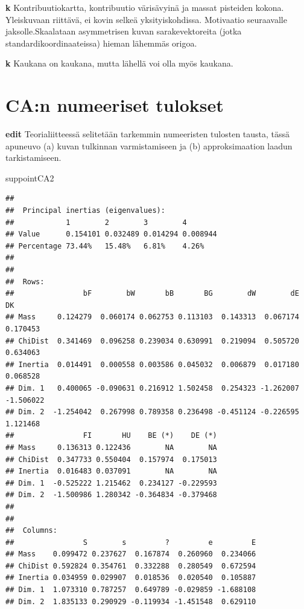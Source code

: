 \documentclass[
  finnish,
]{book}
\newenvironment{Shaded}{\begin{snugshade}}{\end{snugshade}}
\newcommand{\NormalTok}[1]{#1}
\begin{document}
\textbf{k} Kontribuutiokartta, kontribuutio värisävyinä ja massat
pisteiden kokona. Yleiskuvaan riittävä, ei kovin selkeä
yksityiskohdissa. Motivaatio seuraavalle jaksolle.Skaalataan
asymmetrisen kuvan sarakevektoreita (jotka standardikoordinaateissa)
hieman lähemmäs origoa.

\textbf{k} Kaukana on kaukana, mutta lähellä voi olla myös kaukana.

\hypertarget{can-numeeriset-tulokset}{%
\section{CA:n numeeriset tulokset}\label{can-numeeriset-tulokset}}

\textbf{edit} Teorialiitteessä selitetään tarkemmin numeeristen tulosten
tausta, tässä apuneuvo (a) kuvan tulkinnan varmistamiseen ja (b)
approksimaation laadun tarkistamiseen.

\begin{Shaded}
\begin{Highlighting}[]
\NormalTok{suppointCA2}
\end{Highlighting}
\end{Shaded}

\begin{verbatim}
## 
##  Principal inertias (eigenvalues):
##            1        2        3        4       
## Value      0.154101 0.032489 0.014294 0.008944
## Percentage 73.44%   15.48%   6.81%    4.26%   
## 
## 
##  Rows:
##                bF        bW       bB       BG        dW        dE        DK
## Mass     0.124279  0.060174 0.062753 0.113103  0.143313  0.067174  0.170453
## ChiDist  0.341469  0.096258 0.239034 0.630991  0.219094  0.505720  0.634063
## Inertia  0.014491  0.000558 0.003586 0.045032  0.006879  0.017180  0.068528
## Dim. 1   0.400065 -0.090631 0.216912 1.502458  0.254323 -1.262007 -1.506022
## Dim. 2  -1.254042  0.267998 0.789358 0.236498 -0.451124 -0.226595  1.121468
##                FI       HU    BE (*)    DE (*)
## Mass     0.136313 0.122436        NA        NA
## ChiDist  0.347733 0.550404  0.157974  0.175013
## Inertia  0.016483 0.037091        NA        NA
## Dim. 1  -0.525222 1.215462  0.234127 -0.229593
## Dim. 2  -1.500986 1.280342 -0.364834 -0.379468
## 
## 
##  Columns:
##                S        s         ?         e         E
## Mass    0.099472 0.237627  0.167874  0.260960  0.234066
## ChiDist 0.592824 0.354761  0.332288  0.280549  0.672594
## Inertia 0.034959 0.029907  0.018536  0.020540  0.105887
## Dim. 1  1.073310 0.787257  0.649789 -0.029859 -1.688108
## Dim. 2  1.835133 0.290929 -0.119934 -1.451548  0.629110
\end{verbatim}
\end{document}
